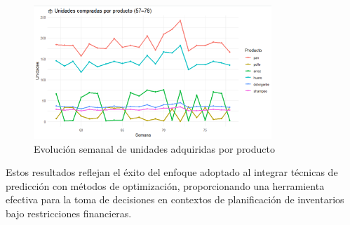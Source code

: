 \documentclass[12pt]{article}
\begin{document}
\begin{figure}[H]
    \centering
    \includegraphics[width=0.8\textwidth]{uproducto1.png}
    \caption{Evolución semanal de unidades adquiridas por producto}
\end{figure}

Estos resultados reflejan el éxito del enfoque adoptado al integrar técnicas de predicción con métodos de optimización, proporcionando una herramienta efectiva para la toma de decisiones en contextos de planificación de inventarios bajo restricciones financieras.
\end{document}
